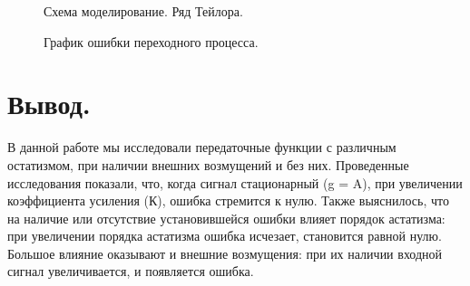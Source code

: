 \documentclass[a4paper, 11pt]{article}
\begin{document}
\newpage 

\begin{figure}[h!]
    \caption{Схема моделирование. Ряд Тейлора.}
    \label{tree}
\end{figure}

\begin{figure}[h]
    \caption{График ошибки переходного процесса.}
    \label{tree}
\end{figure}

\section*{Вывод.} В данной работе мы исследовали передаточные функции с различным остатизмом, при наличии внешних возмущений и без них. Проведенные исследования показали, что, когда сигнал стационарный (g = A), при увеличении коэффициента усиления (К), ошибка стремится к нулю. Также выяснилось, что на наличие или отсутствие установившейся ошибки влияет порядок астатизма: при увеличении порядка астатизма ошибка исчезает, становится равной нулю. Большое влияние оказывают и внешние возмущения: при их наличии входной сигнал увеличивается, и появляется ошибка.
\end{document}
